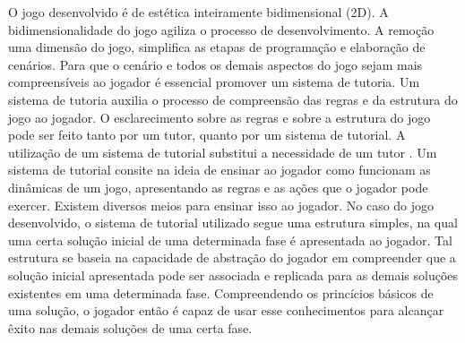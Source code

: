 
O jogo desenvolvido é de estética inteiramente bidimensional (2D). A bidimensionalidade do jogo agiliza o processo de desenvolvimento. A remoção uma dimensão do jogo, simplifica as etapas de programação e elaboração de cenários. Para que o cenário e todos os demais aspectos do jogo sejam mais compreensíveis ao jogador é essencial promover um sistema de tutoria. Um sistema de tutoria auxilia o processo de compreensão das regras e da estrutura do jogo ao jogador. O esclarecimento sobre as regras e sobre a estrutura do jogo pode ser feito tanto por um tutor, quanto por um sistema de tutorial. A utilização de um sistema de tutorial substitui a necessidade de um tutor \cite{buchinger2014sherlock}. Um sistema de tutorial consite na ideia de  ensinar ao jogador como funcionam as dinâmicas de um jogo, apresentando as regras e as ações que o jogador pode exercer. Existem diversos meios para ensinar isso ao jogador. No caso do jogo desenvolvido, o sistema de tutorial utilizado segue uma estrutura simples, na qual uma certa solução inicial de uma determinada fase é apresentada ao jogador. Tal estrutura se baseia na capacidade de abstração do jogador em compreender que a solução inicial apresentada pode ser associada e replicada para as demais soluções existentes em uma determinada fase. Compreendendo os princícios básicos de uma solução, o jogador então é capaz de usar esse conhecimentos para alcançar êxito nas demais soluções de uma certa fase. 


